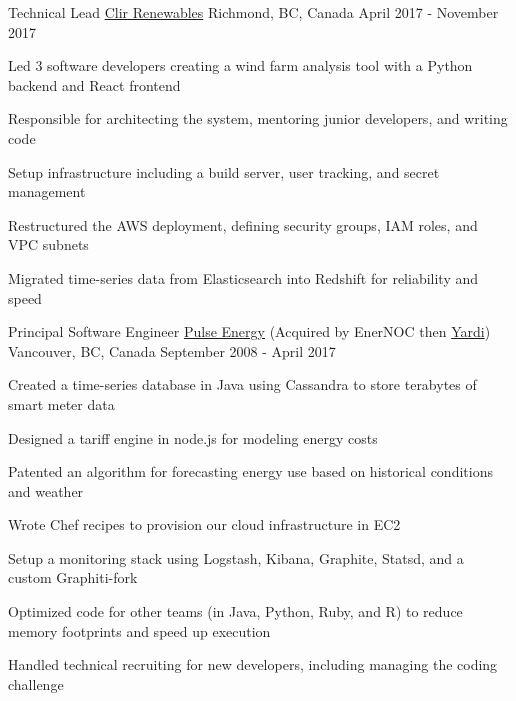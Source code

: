 \begin{cventries}
  \cventry
    {Technical Lead} %
    {\href{https://www.clir.eco}{Clir Renewables}} %
    {Richmond, BC, Canada} %
    {April 2017 - November 2017} %
    {
      \begin{cvitems} %
        \item {Led 3 software developers creating a wind farm analysis tool with a Python backend and React frontend}
        \item {Responsible for architecting the system, mentoring junior developers, and writing code}
        \item {Setup infrastructure including a build server, user tracking, and secret management}
        \item {Restructured the AWS deployment, defining security groups, IAM roles, and VPC subnets}
        \item {Migrated time-series data from Elasticsearch into Redshift for reliability and speed}
      \end{cvitems}
    }


  \cventry
    {Principal Software Engineer} %
    {\href{http://pulseenergy.com}{Pulse Energy} (Acquired by EnerNOC then \href{https://www.yardi.com}{Yardi})} %
    {Vancouver, BC, Canada} %
    {September 2008 - April 2017} %
    {
      \begin{cvitems} %
        \item {Created a time-series database in Java using Cassandra to store terabytes of smart meter data}
        \item {Designed a tariff engine in node.js for modeling energy costs}
        \item {Patented an algorithm for forecasting energy use based on historical conditions and weather}
        \item {Wrote Chef recipes to provision our cloud infrastructure in EC2}
        \item {Setup a monitoring stack using Logstash, Kibana, Graphite, Statsd, and a custom Graphiti-fork}
        \item {Optimized code for other teams (in Java, Python, Ruby, and R) to reduce memory footprints and speed up execution}
        \item {Handled technical recruiting for new developers, including managing the coding challenge}
      \end{cvitems}
    }


\end{cventries}
